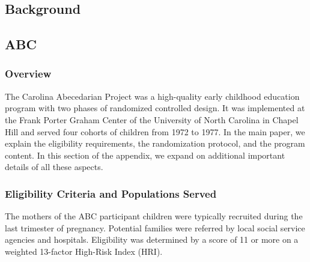 \begin{appendices}
\setcounter{figure}{0}  \renewcommand{\thefigure}{A.\arabic{figure}}
\setcounter{table}{0}   \renewcommand{\thetable}{A.\arabic{table}}

\section{Background} \label{appendix:background}

\subsection{ABC}

\subsubsection{Overview}

\noindent The Carolina Abecedarian Project was a high-quality early childhood education program with two phases of randomized controlled design. It was implemented at the Frank Porter Graham Center of the University of North Carolina in Chapel Hill and served four cohorts of children from 1972 to 1977. In the main paper, we explain the eligibility requirements, the randomization protocol, and the program content. In this section of the appendix, we expand on additional important details of all these aspects.

\subsubsection{Eligibility Criteria and Populations Served}

\noindent The mothers of the ABC participant children were typically recruited during the last trimester  of pregnancy. Potential families were referred by local social service agencies and hospitals. Eligibility was determined by a score of 11 or more on a weighted 13-factor High-Risk Index (HRI).\\ 


\end{appendices}
